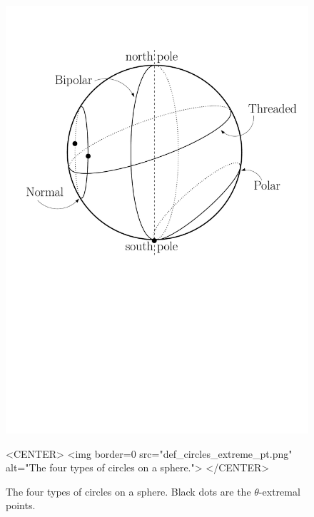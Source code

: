 \begin{figure}[ht!]
  \begin{ccTexOnly}
  \centerline{\includegraphics[height=.5\textwidth]{Circular_kernel_3/def_circles_extreme_pt}}
  \end{ccTexOnly}

  \begin{ccHtmlOnly}
    <CENTER>
      <img border=0 src="def_circles_extreme_pt.png" alt="The four types of circles on a sphere."> 
    </CENTER>
  \end{ccHtmlOnly}

  \caption{The four types of circles on a sphere. Black dots are the $\theta$-extremal points.}
  \label{fig-def-circles}
\end{figure}









